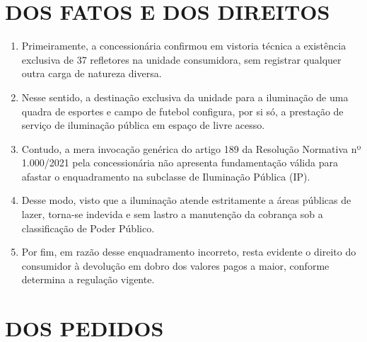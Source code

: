 \newcommand{\tipoRequerimento}{Cobrança indevida sobre enquadramento tarifário incorreto}
\section{DOS FATOS E DOS DIREITOS}


\begin{enumerate}[resume]
    \item Primeiramente, a concessionária confirmou em vistoria técnica a existência exclusiva de 37 refletores na unidade consumidora, sem registrar qualquer outra carga de natureza diversa.
    \item Nesse sentido, a destinação exclusiva da unidade para a iluminação de uma quadra de esportes e campo de futebol configura, por si só, a prestação de serviço de iluminação pública em espaço de livre acesso.
    \item Contudo, a mera invocação genérica do artigo 189 da Resolução Normativa nº 1.000/2021 pela concessionária não apresenta fundamentação válida para afastar o enquadramento na subclasse de Iluminação Pública (IP).
    \item Desse modo, visto que a iluminação atende estritamente a áreas públicas de lazer, torna-se indevida e sem lastro a manutenção da cobrança sob a classificação de Poder Público.
    \item Por fim, em razão desse enquadramento incorreto, resta evidente o direito do consumidor à devolução em dobro dos valores pagos a maior, conforme determina a regulação vigente.
\end{enumerate}

\section{DOS PEDIDOS}

